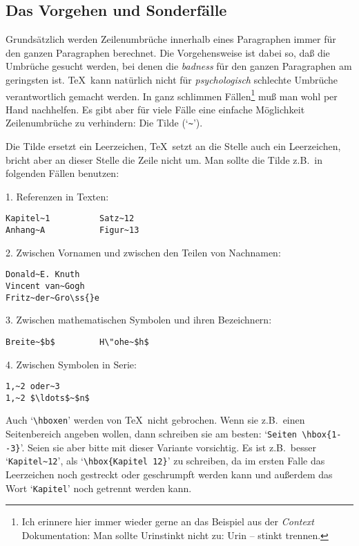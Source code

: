 \subsection{Das Vorgehen und Sonderf\"alle}
Grunds\"atzlich werden Zeilenumbr\"uche innerhalb eines Paragraphen immer
f\"ur den ganzen Paragraphen berechnet. Die Vorgehensweise ist dabei
so, da\ss{} die Umbr\"uche gesucht werden, bei denen die 
{\em badness} f\"ur
den ganzen Paragraphen am geringsten ist. \TeX\ kann nat\"urlich nicht
f\"ur {\em psychologisch} schlechte Umbr\"uche verantwortlich gemacht
werden. In ganz schlimmen F\"allen\footnote{Ich erinnere hier immer
wieder gerne an das Beispiel aus der {\em Context} Dokumentation: Man
sollte Urinstinkt nicht zu: Urin -- stinkt trennen.} mu\ss{} man wohl per
Hand nachhelfen. Es gibt aber f\"ur viele F\"alle eine einfache
M\"oglichkeit Zeilenumbr\"uche zu verhindern: Die Tilde (`\verb|~|').

Die Tilde ersetzt ein 
Leerzeichen, \TeX\ setzt an die Stelle auch ein
Leerzeichen, bricht aber an dieser Stelle die Zeile nicht um. Man
sollte die Tilde z.B.\ in folgenden F\"allen
benutzen:

1. Referenzen in Texten:
\begin{verbatim}
Kapitel~1          Satz~12
Anhang~A           Figur~13
\end{verbatim}

2. Zwischen Vornamen und zwischen den Teilen von
Nachnamen:
\begin{verbatim}
Donald~E. Knuth
Vincent van~Gogh
Fritz~der~Gro\ss{}e
\end{verbatim}

3. Zwischen mathematischen Symbolen und ihren Bezeichnern:
\begin{verbatim}
Breite~$b$         H\"ohe~$h$
\end{verbatim}

4. Zwischen Symbolen in Serie:
\begin{verbatim}
1,~2 oder~3
1,~2 $\ldots$~$n$
\end{verbatim}
Auch 
`\verb|\hboxen|' werden von \TeX\ nicht gebrochen. Wenn sie z.B.\
einen Seitenbereich angeben wollen, dann schreiben sie am besten:
`\verb|Seiten \hbox{1--3}|'. Seien sie aber bitte mit dieser Variante
vorsichtig. Es ist z.B.\ besser `\verb|Kapitel~12|', als
`\verb|\hbox{Kapitel 12}|' zu schreiben, da im ersten Falle das
Leerzeichen noch gestreckt oder geschrumpft werden kann und au\ss{}erdem
das Wort `\verb|Kapitel|' noch getrennt werden kann.

